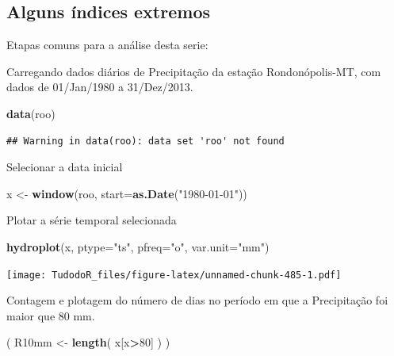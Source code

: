 \documentclass[
]{book}
\newenvironment{Shaded}{\begin{snugshade}}{\end{snugshade}}
\newcommand{\DataTypeTok}[1]{\textcolor[rgb]{0.13,0.29,0.53}{#1}}
\newcommand{\DecValTok}[1]{\textcolor[rgb]{0.00,0.00,0.81}{#1}}
\newcommand{\KeywordTok}[1]{\textcolor[rgb]{0.13,0.29,0.53}{\textbf{#1}}}
\newcommand{\NormalTok}[1]{#1}
\newcommand{\OperatorTok}[1]{\textcolor[rgb]{0.81,0.36,0.00}{\textbf{#1}}}
\newcommand{\StringTok}[1]{\textcolor[rgb]{0.31,0.60,0.02}{#1}}
\begin{document}
\hypertarget{alguns-uxedndices-extremos}{%
\subsection{Alguns índices extremos}\label{alguns-uxedndices-extremos}}

Etapas comuns para a análise desta serie:

Carregando dados diários de Precipitação da estação Rondonópolis-MT, com dados de 01/Jan/1980 a 31/Dez/2013.

\begin{Shaded}
\begin{Highlighting}[]
\KeywordTok{data}\NormalTok{(roo)}
\end{Highlighting}
\end{Shaded}

\begin{verbatim}
## Warning in data(roo): data set 'roo' not found
\end{verbatim}

Selecionar a data inicial

\begin{Shaded}
\begin{Highlighting}[]
\NormalTok{x <-}\StringTok{ }\KeywordTok{window}\NormalTok{(roo, }\DataTypeTok{start=}\KeywordTok{as.Date}\NormalTok{(}\StringTok{"1980-01-01"}\NormalTok{))}
\end{Highlighting}
\end{Shaded}

Plotar a série temporal selecionada

\begin{Shaded}
\begin{Highlighting}[]
\KeywordTok{hydroplot}\NormalTok{(x, }\DataTypeTok{ptype=}\StringTok{"ts"}\NormalTok{, }\DataTypeTok{pfreq=}\StringTok{"o"}\NormalTok{, }\DataTypeTok{var.unit=}\StringTok{"mm"}\NormalTok{)}
\end{Highlighting}
\end{Shaded}

\texttt{[image: TudodoR\_files/figure-latex/unnamed-chunk-485-1.pdf]}

Contagem e plotagem do número de dias no período em que a Precipitação foi maior que 80 mm.

\begin{Shaded}
\begin{Highlighting}[]
\NormalTok{( R10mm <-}\StringTok{ }\KeywordTok{length}\NormalTok{( x[x}\OperatorTok{>}\DecValTok{80}\NormalTok{] ) )}
\end{Highlighting}
\end{Shaded}
\end{document}
